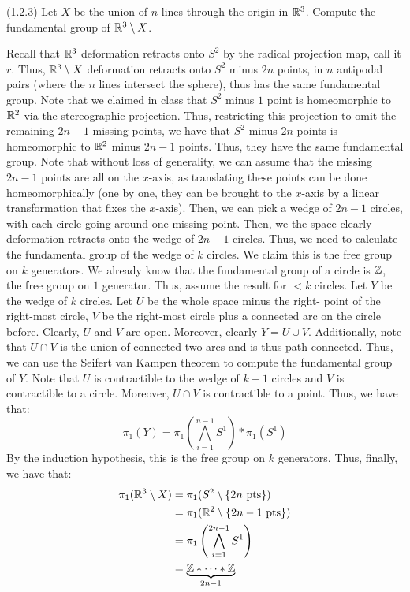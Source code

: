 \documentclass[12pt]{article}
\begin{document}
\begin{problab}{5}
    (1.2.3) Let $X$ be the union of $n$ lines through the origin in $\mathbb R^3$. Compute the fundamental group of $\mathbb R^3 \setminus X$. 
\end{problab}
\begin{solu}
    Recall that $\mathbb R^3$ deformation retracts onto $S^2$ by the radical projection map, call it $r$. Thus, $\mathbb R^3 \setminus X$ deformation retracts onto $S^2$ minus $2n$ points, in $n$ antipodal pairs (where the $n$ lines intersect the sphere), thus has the same fundamental group. \bbni
    Note that we claimed in class that $S^2$ minus $1$ point is homeomorphic to $\mathbb R^2$ via the stereographic projection. Thus, restricting this projection to omit the remaining $2n-1$ missing points, we have that $S^2$ minus $2n$ points is homeomorphic to $\mathbb R^2$ minus $2n-1$ points. Thus, they have the same fundamental group. \bbni    
    Note that without loss of generality, we can assume that the missing $2n-1$ points are all on the $x$-axis, as translating these points can be done homeomorphically (one by one, they can be brought to the $x$-axis by a linear transformation that fixes the $x$-axis). Then, we can pick a wedge of $2n-1$ circles, with each circle going around one missing point. Then, we the space clearly deformation retracts onto the wedge of $2n-1$ circles. \bbni
    Thus, we need to calculate the fundamental group of the wedge of $k$ circles. We claim this is the free group on $k$ generators. We already know that the fundamental group of a circle is $\mathbb Z$, the free group on $1$ generator. Thus, assume the result for $<k$ circles. \bbni 
    Let $Y$ be the wedge of $k$ circles. Let $U$ be the whole space minus the right- point of the right-most circle, $V$ be the right-most circle plus a connected arc on the circle before. Clearly, $U$ and $V$ are open. Moreover, clearly $Y = U \cup V$. \bbni
    Additionally, note that $U \cap V$ is the union of connected two-arcs and is thus path-connected. Thus, we can use the Seifert van Kampen theorem to compute the fundamental group of $Y$. \bbni
    Note that $U$ is contractible to the wedge of $k-1$ circles and $V$ is contractible to a circle. Moreover, $U \cap V$ is contractible to a point. Thus, we have that: 
    \[\pi_1(Y) = \pi_1\left(\bigwedge_{i=1}^{n-1} S^1\right) * \pi_1(S^1) \]
    By the induction hypothesis, this is the free group on $k$ generators. \bbni
    Thus, finally, we have that:
    \begin{align*}
        \pi_1(\mathbb R^3 \setminus X) &= \pi_1(S^2 \setminus \{2n \text{ pts}\})\\  
        &= \pi_1(\mathbb R^2 \setminus\{2n-1 \text{ pts}\}) \\
        &= \pi_1\left(\bigwedge_{i=1}^{2n-1} S^1\right) \\
        &= \underbrace{\mathbb Z * \cdots * \mathbb Z}_{2n-1}
    \end{align*}
\end{solu}
\newpage
\end{document}

